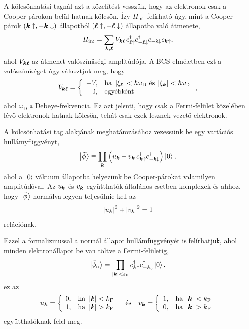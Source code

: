 \documentclass[a4paper,12pt,titlepage]{article}
\newcommand{\KK}{{\vb*{k}}}
\newcommand{\LL}{{\vb*{\ell}}}
\begin{document}
A kölcsönhatási tagnál azt a közelítést vesszük, hogy az elektronok csak a Cooper-párokon belül hatnak kölcsön.  Így $H_\text{int}$ felírható úgy, mint a Cooper-párok $\left( \KK \uparrow, -\KK \downarrow \right)$ állapotból $\left( \LL \uparrow, -\LL \downarrow \right)$ állapotba való átmenete,
\begin{equation} \label{H-int-def}
	H_\text{int} = \sum\limits_{\KK, \LL} V_{\KK \LL} \, c_{\LL \uparrow}^\dagger c_{-\LL \downarrow}^\dagger c_{-\KK \downarrow} c_{\KK \uparrow},
\end{equation}
ahol $V_{\KK \LL}$ az átmenet valószínűségi amplitúdója.  A BCS-elméletben ezt a valószínűséget úgy választjuk meg, hogy
$$ V_{\KK \LL} = \left\{ \begin{array}{rl}
	-V, & \text{ha } \left| \xi_\LL \right| < \hbar \omega_\text{D} \text{ és } \left| \xi_\KK \right| < \hbar \omega_\text{D} \\
	0, & \text{egyébként}
\end{array} \right. , $$
ahol $\omega_\text{D}$ a Debeye-frekvencia.  Ez azt jelenti, hogy csak a Fermi-felület közelében lévő elektronok hatnak kölcsön, tehát csak ezek lesznek vezető elektronok.

A kölcsönhatási tag alakjának meghatározásához vezessünk be egy variációs hullámyfüggvényt,
\begin{equation} \label{phi-tilde}
	\ket{\tilde{\phi}} \equiv \prod\limits_\KK \left( u_\KK + v_\KK \, c_{\KK \uparrow}^\dagger c_{-\KK \downarrow}^\dagger \right) \ket{0},
\end{equation}
ahol a $\ket{0}$ vákuum állapotba helyezünk be Cooper-párokat valamilyen amplitúdóval.  Az $u_\KK$ és $v_\KK$ együtthatók általános esetben komplexek és ahhoz, hogy $\ket{\tilde{\phi}}$ normálva legyen teljesülnie kell az
\begin{equation} \label{u-v-norm}
	\left| u_\KK \right|^2 + \left| v_\KK \right|^2 = 1
\end{equation}
relációnak.

Ezzel a formalizmussal a normál állapot hullámfüggvényét is felírhatjuk, ahol minden elektronállapot be van töltve a Fermi-felületig,
\begin{equation} \label{u-v-normal}
	\ket{\tilde{\phi}_\text{n}} = \prod\limits_{\left| \KK \right| < k_\text{F}} c_{\KK \uparrow}^\dagger c_{-\KK \downarrow}^\dagger \ket{0},
\end{equation}
ez az
\begin{equation} \label{u-v-sc}
	u_\KK = \left\{ \begin{array}{ll} 0, & \text{ha } \left| \KK \right| < k_\text{F} \\ 1, & \text{ha } \left| \KK \right| > k_\text{F} \end{array} \right.
	~~~ \text{és} ~~~
	v_\KK = \left\{ \begin{array}{ll} 1, & \text{ha } \left| \KK \right| < k_\text{F} \\ 0, & \text{ha } \left| \KK \right| > k_\text{F} \end{array} \right.
\end{equation}
együtthatóknak felel meg.
\end{document}
